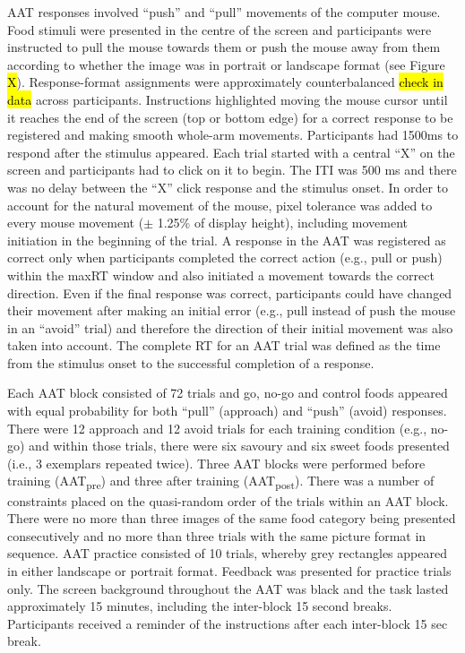 \documentclass[man,floatsintext]{apa6}
\begin{document}
AAT responses involved \enquote{push} and \enquote{pull} movements of the computer mouse. Food stimuli were presented in the centre of the screen and participants were instructed to pull the mouse towards them or push the mouse away from them according to whether the image was in portrait or landscape format (see Figure \hl{X}). Response-format assignments were approximately counterbalanced \hl{check in data} across participants. Instructions highlighted moving the mouse cursor until it reaches the end of the screen (top or bottom edge) for a correct response to be registered and making smooth whole-arm movements. Participants had 1500ms to respond after the stimulus appeared. Each trial started with a central \enquote{X} on the screen and participants had to click on it to begin. The ITI was 500 ms and there was no delay between the \enquote{X} click response and the stimulus onset. In order to account for the natural movement of the mouse, pixel tolerance was added to every mouse movement (\(\pm\) 1.25\% of display height), including movement initiation in the beginning of the trial. A response in the AAT was registered as correct only when participants completed the correct action (e.g., pull or push) within the maxRT window and also initiated a movement towards the correct direction. Even if the final response was correct, participants could have changed their movement after making an initial error (e.g., pull instead of push the mouse in an \enquote{avoid} trial) and therefore the direction of their initial movement was also taken into account. The complete RT for an AAT trial was defined as the time from the stimulus onset to the successful completion of a response.

\par

Each AAT block consisted of 72 trials and go, no-go and control foods appeared with equal probability for both \enquote{pull} (approach) and \enquote{push} (avoid) responses. There were 12 approach and 12 avoid trials for each training condition (e.g., no-go) and within those trials, there were six savoury and six sweet foods presented (i.e., 3 exemplars repeated twice). Three AAT blocks were performed before training (AAT\textsubscript{pre}) and three after training (AAT\textsubscript{post}). There was a number of constraints placed on the quasi-random order of the trials within an AAT block. There were no more than three images of the same food category being presented consecutively and no more than three trials with the same picture format in sequence. AAT practice consisted of 10 trials, whereby grey rectangles appeared in either landscape or portrait format. Feedback was presented for practice trials only. The screen background throughout the AAT was black and the task lasted approximately 15 minutes, including the inter-block 15 second breaks. Participants received a reminder of the instructions after each inter-block 15 sec break.
\end{document}
